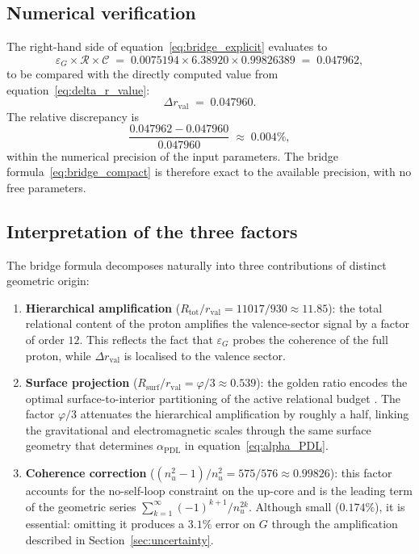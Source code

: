 \documentclass[11pt,a4paper]{article}
\newcommand{\PDL}{\mathrm{PDL}}
\begin{document}
\subsection{Numerical verification}

The right-hand side of equation~\eqref{eq:bridge_explicit} evaluates to
\begin{equation}
    \varepsilon_G \times \mathcal{R} \times \mathcal{C}
    \;=\; 0.0075194 \times 6.38920 \times 0.99826389
    \;=\; 0.047962,
    \label{eq:bridge_numerical}
\end{equation}
to be compared with the directly computed value from equation~\eqref{eq:delta_r_value}:
\begin{equation}
    \Delta r_{\mathrm{val}} \;=\; 0.047960.
\end{equation}
The relative discrepancy is
\begin{equation}
    \frac{0.047962 - 0.047960}{0.047960} 
    \;\approx\; 0.004\%,
    \label{eq:bridge_accuracy}
\end{equation}
within the numerical precision of the input parameters. The bridge formula~\eqref{eq:bridge_compact} is therefore exact to the available precision, with no free parameters.

\subsection{Interpretation of the three factors}

The bridge formula decomposes naturally into three contributions of distinct geometric origin:

\begin{enumerate}

\item \textbf{Hierarchical amplification} 
($R_{\mathrm{tot}}/r_{\mathrm{val}} = 11017/930 \approx 11.85$): the total relational content of the proton amplifies the valence-sector signal by a factor of order $12$. This reflects the fact that $\varepsilon_G$ probes the coherence of the full proton, while $\Delta r_{\mathrm{val}}$ is localised to the valence sector.

\item \textbf{Surface projection} 
($R_{\mathrm{surf}}/r_{\mathrm{val}} = \varphi/3 \approx 0.539$): the golden ratio encodes the optimal surface-to-interior partitioning of the active relational budget \cite{Golden_Ratio_PDL_2026}. The factor $\varphi/3$ attenuates the hierarchical amplification by roughly a half, linking the gravitational and electromagnetic scales through the same surface geometry that determines $\alpha_{\PDL}$ in equation~\eqref{eq:alpha_PDL}.

\item \textbf{Coherence correction} ($(n_u^2-1)/n_u^2 = 575/576 \approx 0.99826$): this factor accounts for the no-self-loop constraint on the up-core and is the leading term of the geometric series $\sum_{k=1}^{\infty}(-1)^{k+1}/n_u^{2k}$. Although small ($0.174\%$), it is essential: omitting it produces a $3.1\%$ error on $G$ through the amplification described in Section~\ref{sec:uncertainty}.

\end{enumerate}
\end{document}
